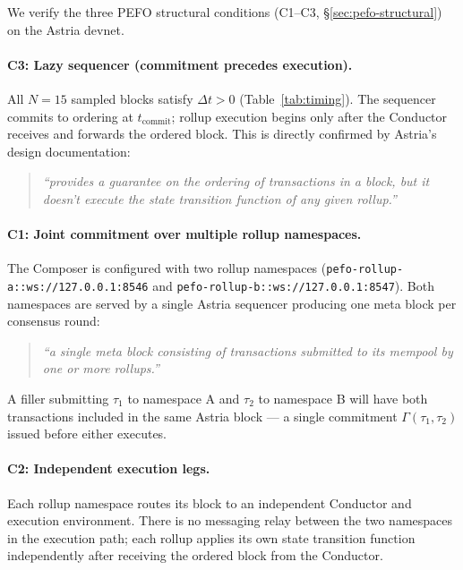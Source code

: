 We verify the three PEFO structural conditions (C1--C3,
\S\ref{sec:pefo-structural}) on the Astria devnet.

\paragraph{C3: Lazy sequencer (commitment precedes execution).}
All $N=15$ sampled blocks satisfy $\Delta t > 0$ (Table~\ref{tab:timing}).
The sequencer commits to ordering at $t_{\mathrm{commit}}$; rollup execution
begins only after the Conductor receives and forwards the ordered block. This
is directly confirmed by Astria's design documentation:

\begin{quote}
\emph{``provides a guarantee on the ordering of transactions in a block, but
it doesn't execute the state transition function of any given
rollup.''}\cite{Astria-TxFlow}
\end{quote}

\paragraph{C1: Joint commitment over multiple rollup namespaces.}
The Composer is configured with two rollup namespaces
(\texttt{pefo-rollup-a::ws://127.0.0.1:8546} and
\texttt{pefo-rollup-b::ws://127.0.0.1:8547}). Both namespaces are served
by a single Astria sequencer producing one meta block per consensus round:

\begin{quote}
\emph{``a single meta block consisting of transactions submitted to its
mempool by one or more rollups.''}\cite{Astria-TxFlow}
\end{quote}

A filler submitting $\tau_1$ to namespace A and $\tau_2$ to namespace B
will have both transactions included in the same Astria block --- a single
commitment $\Gamma(\tau_1, \tau_2)$ issued before either executes.

\paragraph{C2: Independent execution legs.}
Each rollup namespace routes its block to an independent Conductor and
execution environment. There is no messaging relay between the two namespaces
in the execution path; each rollup applies its own state transition function
independently after receiving the ordered block from the Conductor.

